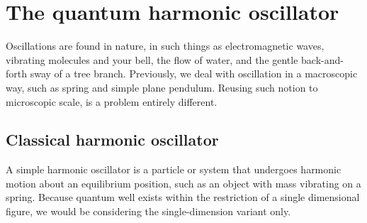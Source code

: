\section{The quantum harmonic oscillator}

Oscillations are found in nature, in such things as electromagnetic waves, vibrating molecules and your bell, the flow of water, and the gentle back-and-forth sway of a tree branch. Previously, we deal with oscillation in a macroscopic way, such as spring and simple plane pendulum. Reusing such notion to microscopic scale, is a problem entirely different. 

\subsection{Classical harmonic oscillator}

A simple harmonic oscillator is a particle or system that undergoes harmonic motion about an equilibrium position, such as an object with mass vibrating on a spring. Because quantum well exists within the restriction of a single dimensional figure, we would be considering the single-dimension variant only. 


